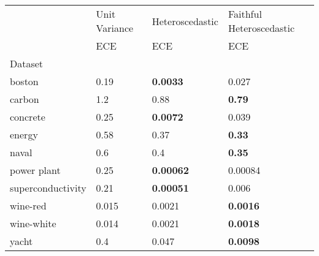 \begin{tabular}{l|l|l|l}
\toprule
 & Unit Variance & Heteroscedastic & Faithful Heteroscedastic \\
 & ECE & ECE & ECE \\
Dataset &  &  &  \\
\midrule
boston & 0.19 & \bfseries 0.0033 & 0.027 \\
carbon & 1.2 & 0.88 & \bfseries 0.79 \\
concrete & 0.25 & \bfseries 0.0072 & 0.039 \\
energy & 0.58 & 0.37 & \bfseries 0.33 \\
naval & 0.6 & 0.4 & \bfseries 0.35 \\
power plant & 0.25 & \bfseries 0.00062 & 0.00084 \\
superconductivity & 0.21 & \bfseries 0.00051 & 0.006 \\
wine-red & 0.015 & 0.0021 & \bfseries 0.0016 \\
wine-white & 0.014 & 0.0021 & \bfseries 0.0018 \\
yacht & 0.4 & 0.047 & \bfseries 0.0098 \\
\bottomrule
\end{tabular}
